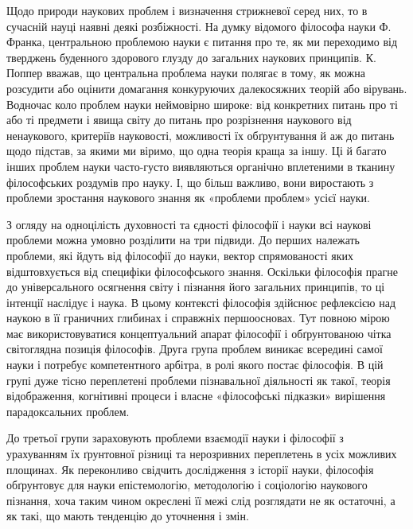 Щодо природи наукових проблем і визначення стрижневої серед них, то в
сучасній науці наявні деякі розбіжності. На думку відомого філософа науки Ф.
Франка, центральною проблемою науки є питання про те, як ми переходимо від
тверджень буденного здорового глузду до загальних наукових принципів.
К. Поппер вважав, що центральна проблема науки полягає в тому, як можна
розсудити або оцінити домагання конкуруючих далекосяжних теорій або
вірувань. Водночас коло проблем науки неймовірно широке: від конкретних
питань про ті або ті предмети і явища світу до питань про розрізнення
наукового від ненаукового, критеріїв науковості, можливості їх обґрунтування
й аж до питань щодо підстав, за якими ми віримо, що одна теорія краща за
іншу. Ці й багато інших проблем науки часто-густо виявляються органічно
вплетеними в тканину філософських роздумів про науку. І, що більш важливо,
вони виростають з проблеми зростання наукового знання як «проблеми
проблем» усієї науки.

З огляду на одноцілість духовності та єдності філософії і науки всі наукові
проблеми можна умовно розділити на три підвиди. До перших належать
проблеми, які йдуть від філософії до науки, вектор спрямованості яких
відштовхується від специфіки філософського знання. Оскільки філософія
прагне до універсального осягнення світу і пізнання його загальних принципів,
то ці інтенції наслідує і наука. В цьому контексті філософія здійснює
рефлексією над наукою в її граничних глибинах і справжніх першоосновах. Тут
повною мірою має використовуватися концептуальний апарат філософії і
обґрунтованою чітка світоглядна позиція філософів.
Друга група проблем виникає всередині самої науки і потребує
компетентного арбітра, в ролі якого постає філософія. В цій групі дуже тісно
переплетені проблеми пізнавальної діяльності як такої, теорія відображення,
когнітивні процеси і власне «філософські підказки» вирішення парадоксальних
проблем.

До третьої групи зараховують проблеми взаємодії науки і філософії з
урахуванням їх ґрунтовної різниці та нерозривних переплетень в усіх можливих
площинах. Як переконливо свідчить дослідження з історії науки, філософія
обґрунтовує для науки епістемологію, методологію і соціологію наукового
пізнання, хоча таким чином окреслені її межі слід розглядати не як остаточні, а
як такі, що мають тенденцію до уточнення і змін.


